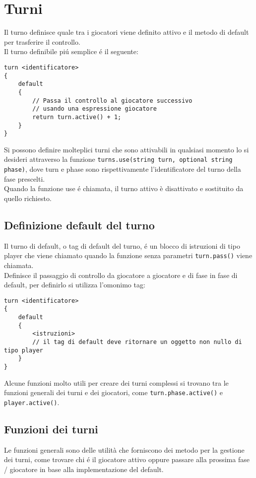 \section{Turni}
Il turno definisce quale tra i giocatori viene definito attivo e il metodo di default
per trasferire il controllo. \\
Il turno definibile piú semplice é il seguente:
\begin{lstlisting}
turn <identificatore>
{
    default
    {
        // Passa il controllo al giocatore successivo 
        // usando una espressione giocatore
        return turn.active() + 1;
    }
}
\end{lstlisting}
Si possono definire molteplici turni che sono attivabili in qualsiasi momento lo si desideri 
attraverso la funzione \lstinline|turns.use(string turn, optional string phase)|, dove
turn e phase sono rispettivamente l'identificatore del turno della fase prescelti. \\
Quando la funzione use é chiamata, il turno attivo è disattivato e sostituito da quello richiesto.

\subsection{Definizione default del turno}
Il turno di default, o tag di default del turno, é un blocco di istruzioni di tipo player
che viene chiamato quando la funzione senza parametri \lstinline|turn.pass()| viene chiamata. \\
Definisce il passaggio di controllo da giocatore a giocatore e di fase in fase di default,
per definirlo si utilizza l'omonimo tag:
\begin{lstlisting}
turn <identificatore>
{
    default
    {
        <istruzioni>
        // il tag di default deve ritornare un oggetto non nullo di tipo player
    }
}
\end{lstlisting}
Alcune funzioni molto utili per creare dei turni complessi si trovano tra le 
funzioni generali dei turni e dei giocatori, come \lstinline|turn.phase.active()| e
\lstinline|player.active()|.

\subsection{Funzioni dei turni}
Le funzioni generali sono delle utilità che forniscono dei metodo per la gestione
dei turni, come trovare chi é il giocatore attivo oppure passare alla prossima 
fase / giocatore in base alla implementazione del default. \\

